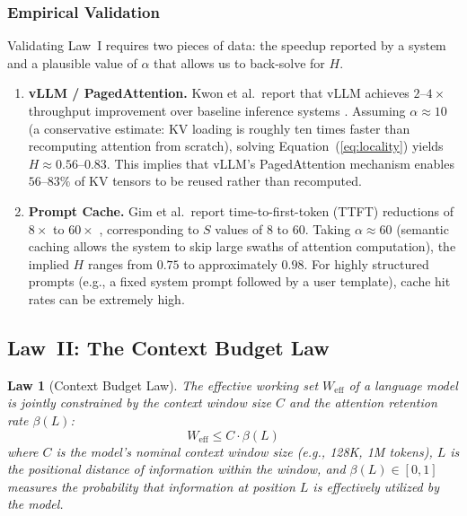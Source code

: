 \documentclass[11pt,a4paper]{article}
\newtheorem{law}{Law}[section]
\begin{document}
\subsubsection{Empirical Validation}

Validating Law~I requires two pieces of data: the speedup reported by a system and a plausible value of $\alpha$ that allows us to back-solve for $H$.

\begin{enumerate}[nosep]
\item \textbf{vLLM / PagedAttention.} Kwon et al.\ report that vLLM achieves $2$--$4\times$ throughput improvement over baseline inference systems \cite{kwon2023pagedattention}. Assuming $\alpha \approx 10$ (a conservative estimate: KV loading is roughly ten times faster than recomputing attention from scratch), solving Equation~(\ref{eq:locality}) yields $H \approx 0.56$--$0.83$. This implies that vLLM's PagedAttention mechanism enables $56$--$83\%$ of KV tensors to be reused rather than recomputed.

\item \textbf{Prompt Cache.} Gim et al.\ report time-to-first-token (TTFT) reductions of $8\times$ to $60\times$ \cite{gim2024promptcache}, corresponding to $S$ values of 8 to 60. Taking $\alpha \approx 60$ (semantic caching allows the system to skip large swaths of attention computation), the implied $H$ ranges from $0.75$ to approximately $0.98$. For highly structured prompts (e.g., a fixed system prompt followed by a user template), cache hit rates can be extremely high.
\end{enumerate}

\subsection{Law~II: The Context Budget Law}
\label{sec:law2}

\begin{law}[Context Budget Law]
The effective working set $W_{\mathrm{eff}}$ of a language model is jointly constrained by the context window size $C$ and the attention retention rate $\beta(L)$:
\begin{equation}
\label{eq:context}
W_{\mathrm{eff}} \leq C \cdot \beta(L)
\end{equation}
where $C$ is the model's nominal context window size (e.g., 128K, 1M tokens), $L$ is the positional distance of information within the window, and $\beta(L) \in [0,1]$ measures the probability that information at position $L$ is effectively utilized by the model.
\end{law}
\end{document}
